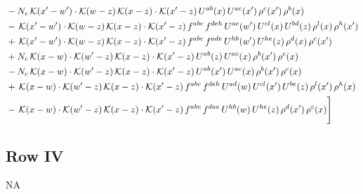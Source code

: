 \documentclass[9pt]{article}
\numberwithin{equation}{section}
\begin{document}
\begin{align}
&-N_{c}\,\mathcal{K}(x'-w')\cdot\mathcal{K}(w-z)\,\mathcal{K}(x-z)\cdot\mathcal{K}(x'-z)\,U^{ab}(x)\,U^{ac}(x')\,\rho^{c}(x')\,\rho^{b}(x)\notag \\
&-\,\mathcal{K}(x'-w')\cdot\mathcal{K}(w-z)\,\mathcal{K}(x-z)\cdot\mathcal{K}(x'-z)\,f^{abc}\,f^{deh}\,U^{ae}(w')\,U^{cl}(x)\,U^{bd}(z)\,\rho^{l}(x)\,\rho^{h}(x')\notag \\
&+\,\mathcal{K}(x'-w')\cdot\mathcal{K}(w-z)\,\mathcal{K}(x-z)\cdot\mathcal{K}(x'-z)\,f^{abc}\,f^{ade}\,U^{hb}(w')\,U^{he}(z)\,\rho^{d}(x)\,\rho^{c}(x')\notag \\
&+N_{c}\,\mathcal{K}(x-w)\cdot\mathcal{K}(w'-z)\,\mathcal{K}(x-z)\cdot\mathcal{K}(x'-z)\,U^{ab}(z)\,U^{ac}(x)\,\rho^{b}(x')\,\rho^{c}(x)\notag \\
&-N_{c}\,\mathcal{K}(x-w)\cdot\mathcal{K}(w'-z)\,\mathcal{K}(x-z)\cdot\mathcal{K}(x'-z)\,U^{ab}(x')\,U^{ac}(x)\,\rho^{b}(x')\,\rho^{c}(x)\notag \\
&+\,\mathcal{K}(x-w)\cdot\mathcal{K}(w'-z)\,\mathcal{K}(x-z)\cdot\mathcal{K}(x'-z)\,f^{abc}\,f^{deh}\,U^{ad}(w)\,U^{cl}(x')\,U^{be}(z)\,\rho^{l}(x')\,\rho^{h}(x)\notag \\
&-\,\mathcal{K}(x-w)\cdot\mathcal{K}(w'-z)\,\mathcal{K}(x-z)\cdot\mathcal{K}(x'-z)\,f^{abc}\,f^{dae}\,U^{hb}(w)\,U^{he}(z)\,\rho^{d}(x')\,\rho^{c}(x)\Bigg]
\end{align}
\subsection{Row IV}
\textsc{NA}
\end{document}
